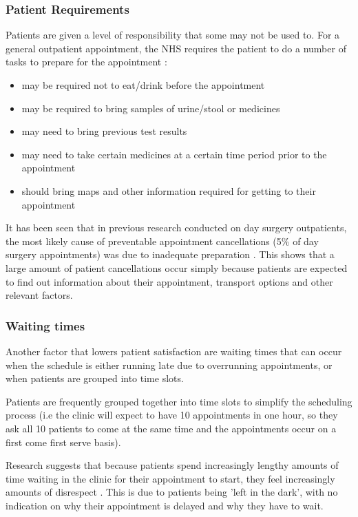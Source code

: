 \subsubsection{Patient Requirements}

Patients are given a level of responsibility that some may not be used to. For a general outpatient appointment, the NHS requires the patient to do a number of tasks to prepare for the appointment \cite{OutpatientApointWebsite}:

\begin{itemize}
  \item may be required not to eat/drink before the appointment
  \item may be required to bring samples of urine/stool or medicines
  \item may need to bring previous test results
  \item may need to take certain medicines at a certain time period prior to the appointment
  \item should bring maps and other information required for getting to their appointment
\end{itemize}

It has been seen that in previous research conducted on day surgery outpatients, the most likely cause of preventable appointment cancellations (5\% of day surgery appointments) was due to inadequate preparation \cite{Macarthur}. This shows that a large amount of patient cancellations occur simply because patients are expected to find out information about their appointment, transport options and other relevant factors.

\subsubsection{Waiting times}

Another factor that lowers patient satisfaction are waiting times that can occur when the schedule is either running late due to overrunning appointments, or when patients are grouped into time slots.

Patients are frequently grouped together into time slots to simplify the scheduling process (i.e the clinic will expect to have 10 appointments in one hour, so they ask all 10 patients to come at the same time and the appointments occur on a first come first serve basis).

Research suggests that because patients spend increasingly lengthy amounts of time waiting in the clinic for their appointment to start, they feel increasingly amounts of disrespect \cite{Lacy}. This is due to patients being 'left in the dark', with no indication on why their appointment is delayed and why they have to wait.

